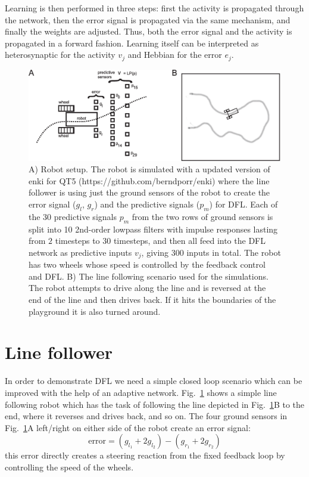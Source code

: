 \documentclass{aamas2018}
\begin{document}
Learning is then performed in three steps: first the activity is
propagated through the network, then the error signal is propagated
via the same mechanism, and finally the weights are adjusted. Thus,
both the error signal and the activity is propagated in a forward
fashion. Learning itself can be interpreted as heterosynaptic for the
activity $v_j$ and Hebbian for the error $e_j$.


\begin{figure}[!ht]
  \centering
  \includegraphics[width=\columnwidth]{linefollower_robot_playground}
  \caption{A) Robot setup. The robot is simulated with a updated
    version of enki for QT5 (https://github.com/berndporr/enki)
    where the line follower is using just the ground sensors of the
    robot to create the error signal ($g_l$, $g_r$) and the predictive signals ($p_m$)
    for DFL. Each of the 30 predictive signals $p_m$ from the two rows of ground sensors
    is split into 10 2nd-order lowpass filters with impulse responses
    lasting from $2$ timesteps to $30$ timesteps, and then all feed into the DFL
    network as predictive inputs $v_j$, giving 300 inputs in total.
    The robot has two wheels whose speed is controlled
    by the feedback control and DFL.
    B) The line following scenario used for the simulations. The robot
    attempts to drive along the line and is reversed at the end of the
    line and then drives back. If it hits the boundaries of the playground
    it is also turned around.
    \label{linefollower_robot_playground}}
\end{figure}





\section{Line follower}
In order to demonstrate DFL we need a simple closed loop scenario
which can be improved with the help of an adaptive network.
Fig.~\ref{linefollower_robot_playground} shows a simple line following
robot which has the task of following the line depicted in
Fig.~\ref{linefollower_robot_playground}B to the end, where it
reverses and drives back, and so on. The four ground sensors in
Fig.~\ref{linefollower_robot_playground}A left/right on either side
of the robot create an error signal:
\begin{equation}
\mathrm{error} = (g_{l_1}+2 g_{l_2})-(g_{r_1}+2 g_{r_2}) \label{line_error}
\end{equation}
this error directly creates a steering reaction from the fixed
feedback loop by controlling the speed of the wheels.
\end{document}
